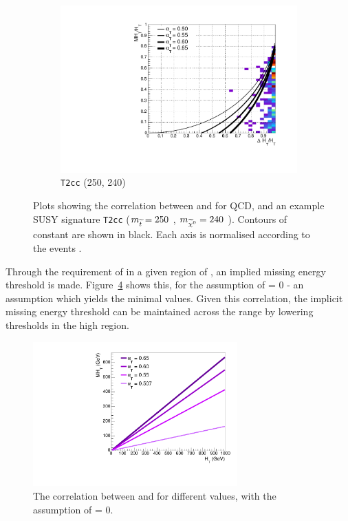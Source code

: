 \begin{figure}[h!]
\begin{subfigure}[b]{.46\textwidth}
    \caption{\zinv}
    \label{fig:alphat_corr_zinv}
  \end{subfigure}\\
  \begin{subfigure}[b]{.46\textwidth}
    \includegraphics[width=\textwidth]{Figs/alphat/alphat_correlation_T2cc_250_240.pdf}
    \caption{\texttt{T2cc} (250, 240)}
    \label{fig:alphat_corr_t2cc}
  \end{subfigure}
  \caption{Plots showing the correlation between \mht and \deltaHT for QCD,
  \zinv and an example SUSY signature \texttt{T2cc} ($m_{\widetilde{t}} = 250$ \gev,
  $m_{\widetilde{\chi}^{0}} = 240$ \gev). Contours of constant \alphat are shown in black.
  Each axis is normalised according to the events \HT.}
  \label{fig:alphat_corr}
\end{figure}

Through the requirement of \alphat in a given region of \HT, an implied missing
energy threshold is made. Figure~\ref{fig:alphat_mht_corr} shows this, for the
assumption of \deltaHT = 0 - an assumption which yields the minimal \mht values.
Given this correlation, the implicit missing energy threshold can be maintained
across the \HT range by lowering \alphat thresholds in the high \HT region.

\begin{figure}
  \centering
  \includegraphics[width=0.7\textwidth]{Figs/alphat/mht_correlation.pdf}
  \caption{The correlation between \HT and \mht for different \alphat values,
  with the assumption of \deltaHT = 0.}
  \label{fig:alphat_mht_corr}
\end{figure}

